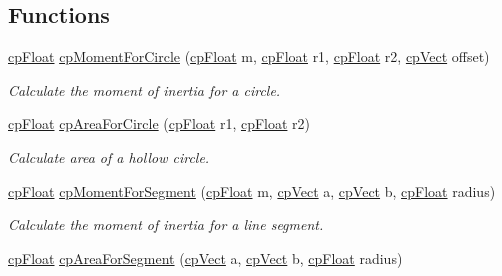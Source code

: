 \subsection*{Functions}
\begin{DoxyCompactItemize}
\item 
\hyperlink{group__basic_types_gac1ed65573e035bf892505768c852d8d3}{cp\+Float} \hyperlink{group__misc_gaf1dfe63f43b3dd42e47f37f16ae2dfe4}{cp\+Moment\+For\+Circle} (\hyperlink{group__basic_types_gac1ed65573e035bf892505768c852d8d3}{cp\+Float} m, \hyperlink{group__basic_types_gac1ed65573e035bf892505768c852d8d3}{cp\+Float} r1, \hyperlink{group__basic_types_gac1ed65573e035bf892505768c852d8d3}{cp\+Float} r2, \hyperlink{structcp_vect}{cp\+Vect} offset)
\begin{DoxyCompactList}\small\item\em Calculate the moment of inertia for a circle. \end{DoxyCompactList}\item 
\hyperlink{group__basic_types_gac1ed65573e035bf892505768c852d8d3}{cp\+Float} \hyperlink{group__misc_ga9293a100703445eed36e8673eefe42a1}{cp\+Area\+For\+Circle} (\hyperlink{group__basic_types_gac1ed65573e035bf892505768c852d8d3}{cp\+Float} r1, \hyperlink{group__basic_types_gac1ed65573e035bf892505768c852d8d3}{cp\+Float} r2)
\begin{DoxyCompactList}\small\item\em Calculate area of a hollow circle. \end{DoxyCompactList}\item 
\hyperlink{group__basic_types_gac1ed65573e035bf892505768c852d8d3}{cp\+Float} \hyperlink{group__misc_ga1df4d84f2b6ab3cb74d790b55e6a16d4}{cp\+Moment\+For\+Segment} (\hyperlink{group__basic_types_gac1ed65573e035bf892505768c852d8d3}{cp\+Float} m, \hyperlink{structcp_vect}{cp\+Vect} a, \hyperlink{structcp_vect}{cp\+Vect} b, \hyperlink{group__basic_types_gac1ed65573e035bf892505768c852d8d3}{cp\+Float} radius)
\begin{DoxyCompactList}\small\item\em Calculate the moment of inertia for a line segment. \end{DoxyCompactList}\item 
\hypertarget{group__misc_ga5749ef4558e38005cea36d5eac560ca5}{}\hyperlink{group__basic_types_gac1ed65573e035bf892505768c852d8d3}{cp\+Float} \hyperlink{group__misc_ga5749ef4558e38005cea36d5eac560ca5}{cp\+Area\+For\+Segment} (\hyperlink{structcp_vect}{cp\+Vect} a, \hyperlink{structcp_vect}{cp\+Vect} b, \hyperlink{group__basic_types_gac1ed65573e035bf892505768c852d8d3}{cp\+Float} radius)\label{group__misc_ga5749ef4558e38005cea36d5eac560ca5}


\end{DoxyCompactItemize}
